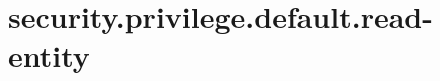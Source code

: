 \section{security.privilege.default.read-entity}
\label{configuration:SecurityPrivilegeDefaultReadEntity}
\TODO
